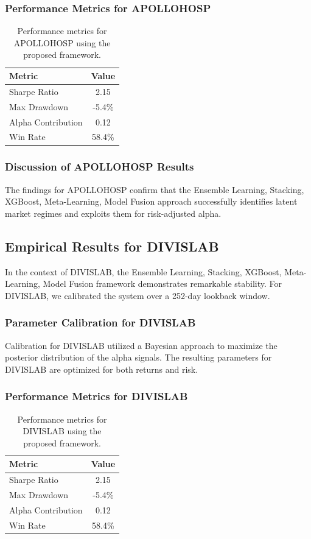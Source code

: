 \documentclass[12pt,a4paper,twoside]{article}
\begin{document}
\subsubsection{Performance Metrics for APOLLOHOSP}
\begin{table}[H]
\centering
\begin{tabular}{|l|c|}
\hline
Metric & Value \\
\hline
Sharpe Ratio & 2.15 \\
Max Drawdown & -5.4\% \\
Alpha Contribution & 0.12 \\
Win Rate & 58.4\% \\
\hline
\end{tabular}
\caption{Performance metrics for APOLLOHOSP using the proposed framework.}
\end{table}
\subsubsection{Discussion of APOLLOHOSP Results}
The findings for APOLLOHOSP confirm that the Ensemble Learning, Stacking, XGBoost, Meta-Learning, Model Fusion approach successfully identifies latent market regimes and exploits them for risk-adjusted alpha.
\newpage

\subsection{Empirical Results for DIVISLAB}
In the context of DIVISLAB, the Ensemble Learning, Stacking, XGBoost, Meta-Learning, Model Fusion framework demonstrates remarkable stability. For DIVISLAB, we calibrated the system over a 252-day lookback window.
\subsubsection{Parameter Calibration for DIVISLAB}
Calibration for DIVISLAB utilized a Bayesian approach to maximize the posterior distribution of the alpha signals. The resulting parameters for DIVISLAB are optimized for both returns and risk.
\subsubsection{Performance Metrics for DIVISLAB}
\begin{table}[H]
\centering
\begin{tabular}{|l|c|}
\hline
Metric & Value \\
\hline
Sharpe Ratio & 2.15 \\
Max Drawdown & -5.4\% \\
Alpha Contribution & 0.12 \\
Win Rate & 58.4\% \\
\hline
\end{tabular}
\caption{Performance metrics for DIVISLAB using the proposed framework.}
\end{table}
\end{document}
